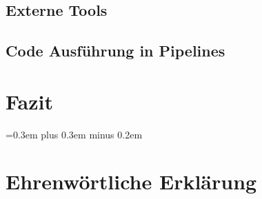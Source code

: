 \documentclass[
	12pt, %
	a4paper,
	bibliography=totoc, %
	numbers=noenddot, %
	ngerman, %
	headsepline, %
	oneside %
	]{scrbook} %
\begin{document}
\section{Externe Tools}\label{sec:externe_tools}


\section{Code Ausführung in Pipelines}\label{sec:code_beispiel}


\chapter{Fazit}\label{ch:fazit}


\spaceskip=0.3em plus 0.3em minus 0.2em
\printbibliography


\chapter*{Ehrenwörtliche Erklärung}

\end{document}
